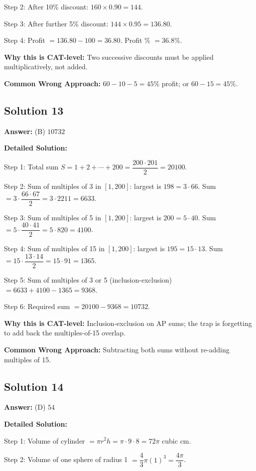 \documentclass[11pt]{article}
\begin{document}
Step 2: After 10\% discount: \(160 \times 0.90 = 144\).

Step 3: After further 5\% discount: \(144 \times 0.95 = 136.80\).

Step 4: Profit \(= 136.80 - 100 = 36.80\). Profit \% \(= 36.8\%\).

\textbf{Why this is CAT-level:}
Two successive discounts must be applied multiplicatively, not added.

\textbf{Common Wrong Approach:}
\(60 - 10 - 5 = 45\%\) profit; or \(60 - 15 = 45\%\).

\subsection*{Solution 13}
\textbf{Answer:} (B) \(10732\)

\textbf{Detailed Solution:}

Step 1: Total sum \(S = 1+2+\cdots+200 = \dfrac{200 \cdot 201}{2} = 20100\).

Step 2: Sum of multiples of 3 in \([1,200]\): largest is \(198 = 3 \cdot 66\). Sum \(= 3 \cdot \dfrac{66 \cdot 67}{2} = 3 \cdot 2211 = 6633\).

Step 3: Sum of multiples of 5 in \([1,200]\): largest is \(200 = 5 \cdot 40\). Sum \(= 5 \cdot \dfrac{40 \cdot 41}{2} = 5 \cdot 820 = 4100\).

Step 4: Sum of multiples of 15 in \([1,200]\): largest is \(195 = 15 \cdot 13\). Sum \(= 15 \cdot \dfrac{13 \cdot 14}{2} = 15 \cdot 91 = 1365\).

Step 5: Sum of multiples of 3 or 5 (inclusion-exclusion) \(= 6633 + 4100 - 1365 = 9368\).

Step 6: Required sum \(= 20100 - 9368 = 10732\).

\textbf{Why this is CAT-level:}
Inclusion-exclusion on AP sums; the trap is forgetting to add back the multiples-of-15 overlap.

\textbf{Common Wrong Approach:}
Subtracting both sums without re-adding multiples of 15.

\subsection*{Solution 14}
\textbf{Answer:} (D) \(54\)

\textbf{Detailed Solution:}

Step 1: Volume of cylinder \(= \pi r^2 h = \pi \cdot 9 \cdot 8 = 72\pi\) cubic cm.

Step 2: Volume of one sphere of radius 1 \(= \dfrac{4}{3}\pi(1)^3 = \dfrac{4\pi}{3}\).
\end{document}
